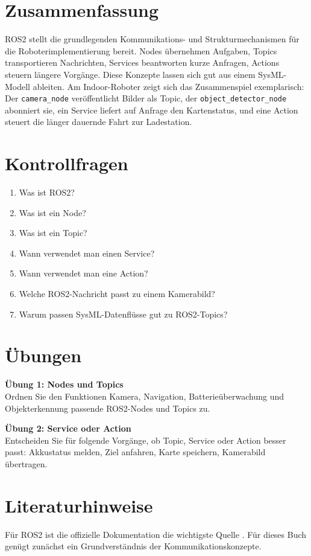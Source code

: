 \section{Zusammenfassung}
ROS2 stellt die grundlegenden Kommunikations- und Strukturmechanismen für die Roboterimplementierung bereit. Nodes übernehmen Aufgaben, Topics transportieren Nachrichten, Services beantworten kurze Anfragen, Actions steuern längere Vorgänge. Diese Konzepte lassen sich gut aus einem SysML-Modell ableiten. Am Indoor-Roboter zeigt sich das Zusammenspiel exemplarisch: Der \texttt{camera\_node} veröffentlicht Bilder als Topic, der \texttt{object\_detector\_node} abonniert sie, ein Service liefert auf Anfrage den Kartenstatus, und eine Action steuert die länger dauernde Fahrt zur Ladestation.

\section{Kontrollfragen}
\begin{enumerate}
    \item Was ist ROS2?
    \item Was ist ein Node?
    \item Was ist ein Topic?
    \item Wann verwendet man einen Service?
    \item Wann verwendet man eine Action?
    \item Welche ROS2-Nachricht passt zu einem Kamerabild?
    \item Warum passen SysML-Datenflüsse gut zu ROS2-Topics?
\end{enumerate}

\section{Übungen}
\begin{uebungbox}
\textbf{Übung 1: Nodes und Topics}\\
Ordnen Sie den Funktionen Kamera, Navigation, Batterieüberwachung und Objekterkennung passende ROS2-Nodes und Topics zu.
\end{uebungbox}

\begin{uebungbox}
\textbf{Übung 2: Service oder Action}\\
Entscheiden Sie für folgende Vorgänge, ob Topic, Service oder Action besser passt: Akkustatus melden, Ziel anfahren, Karte speichern, Kamerabild übertragen.
\end{uebungbox}

\section{Literaturhinweise}
Für ROS2 ist die offizielle Dokumentation die wichtigste Quelle \cite{ros2docs}. Für dieses Buch genügt zunächst ein Grundverständnis der Kommunikationskonzepte.
